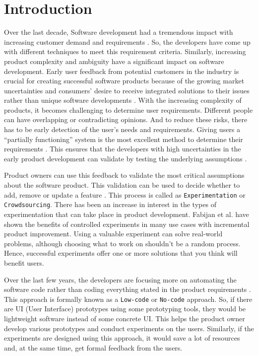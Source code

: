 \chapter{Introduction} \label{chap:intro}

Over the last decade, Software development had a tremendous impact with increasing customer demand and requirements \cite{article:swdemand:ahmed}. 
So, the developers have come up with different techniques to meet this requirement criteria. 
Similarly, increasing product complexity and ambiguity have a significant impact on software development. 
Early user feedback from potential customers in the industry is crucial for creating successful software products because of the growing market uncertainties and consumers' desire to receive integrated solutions to their issues rather than unique software developments \cite{misc:businessmodels:teece}.
With the increasing complexity of products, it becomes challenging to determine user requirements.
Different people can have overlapping or contradicting opinions. 
And to reduce these risks, there has to be early detection of the user's needs and requirements. 
Giving users a ``partially functioning'' system is the most excellent method to determine their requirements \cite{journal:prototyping:davis}.
This ensures that the developers with high uncertainties in the early product development can validate by testing the underlying assumptions \cite{misc:lean:steve}.

Product owners can use this feedback to validate the most critical assumptions about the software product. 
This validation can be used to decide whether to add, remove or update a feature \cite{article:experiments:lindgren}. 
This process is called as \texttt{Experimentation} or \texttt{Crowdsourcing}.  
There has been an increase in interest in the types of experimentation that can take place in product development. 
Fabijan et al. \cite{paper:controlled:experiemnts} have shown the benefits of controlled experiments in many use cases with incremental product improvement. 
Using a valuable experiment can solve real-world problems, although choosing what to work on shouldn't be a random process. 
Hence, successful experiments offer one or more solutions that you think will benefit users.

Over the last few years, the developers are focusing more on automating the software code rather than coding everything stated in the product requirements \cite{article:prototyping:hoffnagle}.
This approach is formally known as a \texttt{Low-code} or \texttt{No-code} approach.
So, if there are UI (User Interface) prototypes using some prototyping tools, they would be lightweight software instead of some concrete UI.
This helps the product owner develop various prototypes and conduct experiments on the users.
Similarly, if the experiments are designed using this approach, it would save a lot of resources and, at the same time, get formal feedback from the users. 

